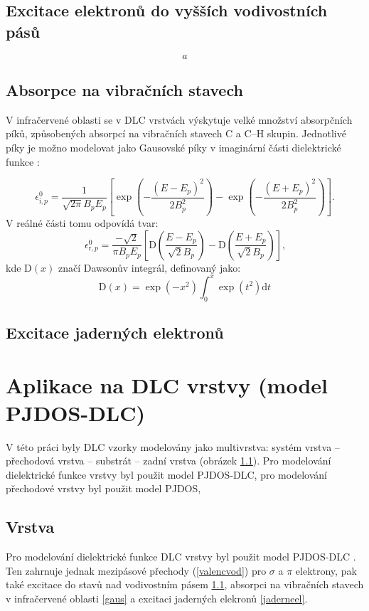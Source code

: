 \subsection{Excitace elektronů do vyšších vodivostních pásů}
\begin{equation}
a
\end{equation}


\subsection{Absorpce na vibračních stavech}
V infračervené oblasti se v DLC vrstvách výskytuje velké množství absorpčních píků, způsobených absorpcí na vibračních stavech C a C--H skupin. Jednotlivé píky je možno modelovat jako Gausovské píky v imaginární části dielektrické funkce \cite{franta2007}:

\begin{equation}
\epsilon^0_{\mathrm{i},p} = \frac{1}{\sqrt{2 \pi} B_p E_p} \left[ \exp\left(-\frac{(E-E_p)^2}{2B_p^2}\right) - \exp\left(-\frac{(E+E_p)^2}{2B_p^2}\right) \right] \text{.}
\end{equation}
V reálné části tomu odpovídá tvar:
\begin{equation}
\epsilon^0_{\mathrm{r},p} = \frac{-\sqrt{2}}{\pi B_p E_p} \left[ \mathrm{D}\left(\frac{E-E_p}{\sqrt{2}B_p}\right) - \mathrm{D}\left(\frac{E+E_p}{\sqrt{2}B_p}\right) \right] \text{,}
\end{equation}
kde $\mathrm{D}(x)$ značí Dawsonův integrál, definovaný jako:
\begin{equation}
\mathrm{D}(x) = \exp(-x^2)\int_0^x \exp(t^2) \mathrm{d}t
\end{equation}

\subsection{Excitace jaderných elektronů}



\section{Aplikace na DLC vrstvy (model PJDOS-DLC)}
V této práci byly DLC vzorky modelovány jako multivrstva: systém vrstva -- přechodová vrstva -- substrát -- zadní vrstva (obrázek \ref{}). Pro modelování dielektrické funkce vrstvy byl použit model PJDOS-DLC, pro modelování přechodové vrstvy byl použit model PJDOS, 

\subsection{Vrstva}
Pro modelování dielektrické funkce DLC vrstvy byl použit model PJDOS-DLC \cite{franta2007}. Ten zahrnuje jednak mezipásové přechody (\ref{valencvod}) pro $\sigma$ a $\pi$ elektrony, pak také excitace do stavů nad vodivostním pásem \ref{}, absorpci na vibračních stavech v infračervené oblasti \ref{gaus} a excitaci jaderných elekronů \ref{jaderneel}. 

